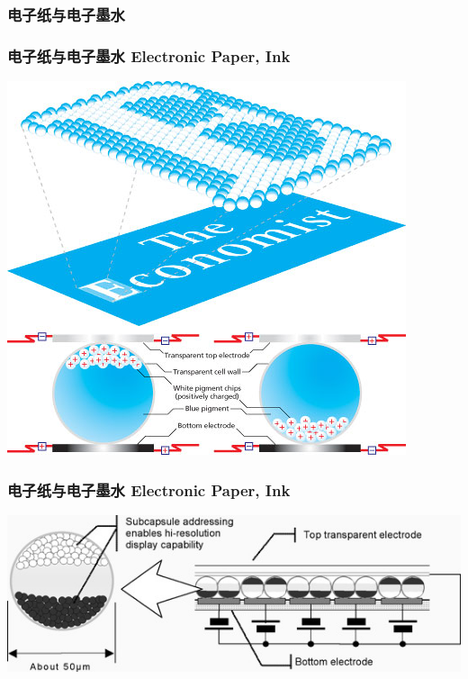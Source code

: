 \documentclass{beamer}
\newcommand{\fullPageImage}[2]{
	{
		\usebackgroundtemplate{\texttt{[image: \#1]}}
		\frame[plain]{#2}
	}
}
\begin{document}
\subsubsection{电子纸与电子墨水}
\fullPageImage{images/ebooks.jpg}{\transwipe}
\fullPageImage{images/kindle-inside.jpg}{\transwipe}

\begin{frame}
	\frametitle{电子纸与电子墨水 Electronic Paper, Ink}
	\transwipe
	\begin{center}
	\includegraphics[height=.8\textheight, width=.6\textwidth]{images/e-ink-technology.jpg}
	\end{center}
\end{frame}

\begin{frame}
	\frametitle{电子纸与电子墨水 Electronic Paper, Ink}
	\transwipe
	\begin{center}
	\includegraphics[width=\textwidth]{images/e-ink-technology-detail.jpg}
	\end{center}
\end{frame}
\end{document}
